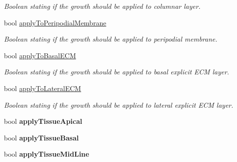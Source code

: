 \begin{DoxyCompactItemize}
\begin{DoxyCompactList}\small\item\em Boolean stating if the growth should be applied to columnar layer. \end{DoxyCompactList}\item 
\hypertarget{classGrowthFunctionBase_a08ae19f58cb98fa8e315a77f52749732}{}bool \hyperlink{classGrowthFunctionBase_a08ae19f58cb98fa8e315a77f52749732}{apply\+To\+Peripodial\+Membrane}\label{classGrowthFunctionBase_a08ae19f58cb98fa8e315a77f52749732}

\begin{DoxyCompactList}\small\item\em Boolean stating if the growth should be applied to peripodial membrane. \end{DoxyCompactList}\item 
\hypertarget{classGrowthFunctionBase_a9fe46fc6dde4041b79204beb48972a09}{}bool \hyperlink{classGrowthFunctionBase_a9fe46fc6dde4041b79204beb48972a09}{apply\+To\+Basal\+E\+C\+M}\label{classGrowthFunctionBase_a9fe46fc6dde4041b79204beb48972a09}

\begin{DoxyCompactList}\small\item\em Boolean stating if the growth should be applied to basal explicit E\+C\+M layer. \end{DoxyCompactList}\item 
\hypertarget{classGrowthFunctionBase_ac623b1dbe376bce5dddbe1a2e21c776f}{}bool \hyperlink{classGrowthFunctionBase_ac623b1dbe376bce5dddbe1a2e21c776f}{apply\+To\+Lateral\+E\+C\+M}\label{classGrowthFunctionBase_ac623b1dbe376bce5dddbe1a2e21c776f}

\begin{DoxyCompactList}\small\item\em Boolean stating if the growth should be applied to lateral explicit E\+C\+M layer. \end{DoxyCompactList}\item 
\hypertarget{classGrowthFunctionBase_a254c82be25d3648a0474c24a63d5a555}{}bool {\bfseries apply\+Tissue\+Apical}\label{classGrowthFunctionBase_a254c82be25d3648a0474c24a63d5a555}

\item 
\hypertarget{classGrowthFunctionBase_afcbfd4691a386ba9dbf75888e0a4ef9e}{}bool {\bfseries apply\+Tissue\+Basal}\label{classGrowthFunctionBase_afcbfd4691a386ba9dbf75888e0a4ef9e}

\item 
\hypertarget{classGrowthFunctionBase_a95cb51fffd8fbb1466510cc40853aeed}{}bool {\bfseries apply\+Tissue\+Mid\+Line}\label{classGrowthFunctionBase_a95cb51fffd8fbb1466510cc40853aeed}


\end{DoxyCompactItemize}
